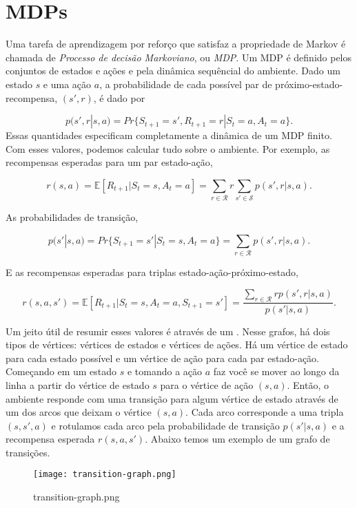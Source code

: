 \documentclass{article}
\begin{document}
\section{MDPs}

Uma tarefa de aprendizagem por reforço que satisfaz a propriedade de Markov é chamada de \textit{Processo de decisão Markoviano}, ou \textit{MDP}. Um MDP é definido pelos conjuntos de estados e ações e pela dinâmica sequêncial do ambiente. Dado um estado $s$ e uma ação $a$, a probabilidade de cada possível par de próximo-estado-recompensa, $(s',r)$, é dado por

\[
  p(s',r|s,a)=Pr\{S_{t+1}=s',R_{t+1}=r|S_t=a,A_t=a\}
.\] 
Essas quantidades especificam completamente a dinâmica de um MDP finito. Com esses valores, podemos calcular tudo sobre o ambiente. Por exemplo, as recompensas esperadas para um par estado-ação,

\[
  r(s,a)=\mathbb{E}[R_{t+1} | S_t=s,A_t=a]=\sum_{r\in \mathcal{R}}r \sum_{s'\in \mathcal{S}} p(s',r|s,a)
.\] 

As probabilidades de transição,

\[
  p(s'|s,a)=Pr\{S_{t+1}=s'|S_t=s,A_t=a\} = \sum_{r \in \mathcal{R}} p(s',r|s,a)
.\] 

E as recompensas esperadas para triplas estado-ação-próximo-estado,

\[
  r(s,a,s')=\mathbb{E}[R_{t+1} | S_t=s,A_t=a,S_{t+1}=s'] = \frac{\sum_{r \in \mathcal{R}}rp(s',r|s,a)}{p(s'|s,a)}
.\] 


Um jeito útil de resumir esses valores é através de um . Nesse grafos, há dois tipos de vértices: vértices de estados e vértices de ações. Há um vértice de estado para cada estado possível e um vértice de ação para cada par estado-ação. Começando em um estado $s$ e tomando a ação $a$ faz você se mover ao longo da linha a partir do vértice de estado $s$ para o vértice de ação $(s,a)$. Então, o ambiente responde com uma transição para algum vértice de estado através de um dos arcos que deixam o vértice $(s,a)$. Cada arco corresponde a uma tripla $(s,s',a)$ e rotulamos cada arco pela probabilidade de transição $p(s'|s,a)$ e a recompensa esperada $r(s,a,s')$. Abaixo temos um exemplo de um grafo de transições.

\begin{figure}[htpb]
  \centering
  \texttt{[image: transition-graph.png]}
  \caption{transition-graph.png}
  \label{fig:transition-graph-png}
\end{figure}
\end{document}
